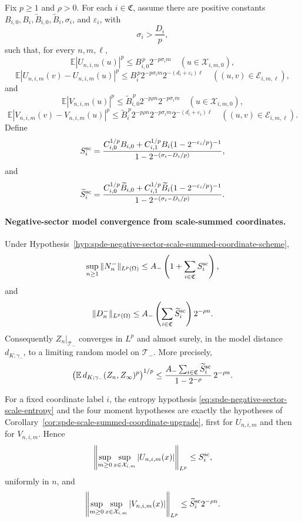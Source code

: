 \begin{hypothesis}
Fix \(p\geq1\) and \(\rho>0\).  For each \(i\in\mathfrak C\), assume there are
positive constants \(B_{i,0},B_i,\widetilde B_{i,0},\widetilde B_i,\sigma_i\),
and \(\varepsilon_i\), with
\begin{equation}
  \sigma_i>\frac{D_i}{p},
  \label{eq:spde-negative-sector-scale-slack}
\end{equation}
such that, for every \(n,m,\ell\),
\[
  \mathbb E|U_{n,i,m}(u)|^p
  \leq
  B_{i,0}^{\,p}2^{-p\sigma_i m}
  \quad(u\in\mathcal X_{i,m,0}),
\]
\[
  \mathbb E|U_{n,i,m}(v)-U_{n,i,m}(u)|^p
  \leq
  B_i^{\,p}2^{-p\sigma_i m}2^{-(d_i+\varepsilon_i)\ell}
  \quad((u,v)\in\mathcal E_{i,m,\ell}),
\]
and
\[
  \mathbb E|V_{n,i,m}(u)|^p
  \leq
  \widetilde B_{i,0}^{\,p}2^{-p\rho n}2^{-p\sigma_i m}
  \quad(u\in\mathcal X_{i,m,0}),
\]
\[
  \mathbb E|V_{n,i,m}(v)-V_{n,i,m}(u)|^p
  \leq
  \widetilde B_i^{\,p}2^{-p\rho n}2^{-p\sigma_i m}
  2^{-(d_i+\varepsilon_i)\ell}
  \quad((u,v)\in\mathcal E_{i,m,\ell}).
\]
Define
\[
  S_i^{\rm sc}
  =
  \frac{
    C_{i,0}^{1/p}B_{i,0}
    +C_{i,1}^{1/p}B_i(1-2^{-\varepsilon_i/p})^{-1}
  }
  {1-2^{-(\sigma_i-D_i/p)}},
\]
and
\[
  \widetilde S_i^{\rm sc}
  =
  \frac{
    C_{i,0}^{1/p}\widetilde B_{i,0}
    +C_{i,1}^{1/p}\widetilde B_i(1-2^{-\varepsilon_i/p})^{-1}
  }
  {1-2^{-(\sigma_i-D_i/p)}} .
\]
\end{hypothesis}

\paragraph{Negative-sector model convergence from scale-summed coordinates.}
\label{thm:spde-phi-four-three-negative-sector-model-convergence}
Under Hypothesis~\ref{hyp:spde-negative-sector-scale-summed-coordinate-scheme},
\[
  \sup_{n\geq1}\|N_n^-\|_{L^p(\Omega)}
  \leq
  A_-\left(1+\sum_{i\in\mathfrak C}S_i^{\rm sc}\right),
\]
and
\begin{equation}
  \|D_n^-\|_{L^p(\Omega)}
  \leq
  A_-\left(\sum_{i\in\mathfrak C}\widetilde S_i^{\rm sc}\right)2^{-\rho n}.
  \label{eq:spde-negative-sector-model-cauchy-bound}
\end{equation}
Consequently \(Z_n|_{\mathcal T_-}\) converges in \(L^p\) and almost surely,
in the model distance \(d_{K;\gamma_-}\), to a limiting random model on
\(\mathcal T_-\).  More precisely,
\[
  \left(
    \mathbb E\,d_{K;\gamma_-}(Z_n,Z_\infty)^p
  \right)^{1/p}
  \leq
  \frac{
    A_-\sum_{i\in\mathfrak C}\widetilde S_i^{\rm sc}
  }
  {1-2^{-\rho}}\,2^{-\rho n}.
\]

For a fixed coordinate label \(i\), the entropy hypothesis
\eqref{eq:spde-negative-sector-scale-entropy} and the four moment hypotheses
are exactly the hypotheses of
Corollary~\ref{cor:spde-scale-summed-coordinate-upgrade}, first for
\(U_{n,i,m}\) and then for \(V_{n,i,m}\).  Hence
\[
  \left\|
    \sup_{m\geq0}\sup_{x\in\mathcal X_{i,m}}
    |U_{n,i,m}(x)|
  \right\|_{L^p}
  \leq
  S_i^{\rm sc},
\]
uniformly in \(n\), and
\[
  \left\|
    \sup_{m\geq0}\sup_{x\in\mathcal X_{i,m}}
    |V_{n,i,m}(x)|
  \right\|_{L^p}
  \leq
  \widetilde S_i^{\rm sc}2^{-\rho n}.
\]

